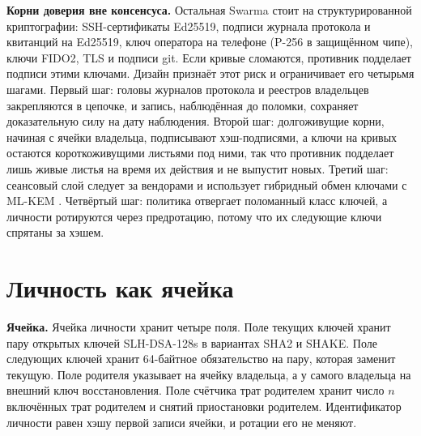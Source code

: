 \documentclass[10pt,a4paper]{article}
\begin{document}
\textbf{Корни доверия вне консенсуса.}
Остальная Swarma стоит на структурированной криптографии: SSH-сертификаты Ed25519, подписи журнала протокола и квитанций на Ed25519, ключ оператора на телефоне (P-256 в защищённом чипе), ключи FIDO2, TLS и подписи git.
Если кривые сломаются, противник подделает подписи этими ключами.
Дизайн признаёт этот риск и ограничивает его четырьмя шагами.
Первый шаг: головы журналов протокола и реестров владельцев закрепляются в цепочке, и запись, наблюдённая до поломки, сохраняет доказательную силу на дату наблюдения.
Второй шаг: долгоживущие корни, начиная с ячейки владельца, подписывают хэш-подписями, а ключи на кривых остаются короткоживущими листьями под ними, так что противник подделает лишь живые листья на время их действия и не выпустит новых.
Третий шаг: сеансовый слой следует за вендорами и использует гибридный обмен ключами с ML-KEM \cite{fips203}.
Четвёртый шаг: политика отвергает поломанный класс ключей, а личности ротируются через предротацию, потому что их следующие ключи спрятаны за хэшем.

\section{Личность как ячейка}
\label{sec:identity}

\textbf{Ячейка.}
Ячейка личности хранит четыре поля.
Поле текущих ключей хранит пару открытых ключей SLH-DSA-128s в вариантах SHA2 и SHAKE.
Поле следующих ключей хранит 64-байтное обязательство на пару, которая заменит текущую.
Поле родителя указывает на ячейку владельца, а у самого владельца на внешний ключ восстановления.
Поле счётчика трат родителем хранит число $n$ включённых трат родителем и снятий приостановки родителем.
Идентификатор личности равен хэшу первой записи ячейки, и ротации его не меняют.
\end{document}
